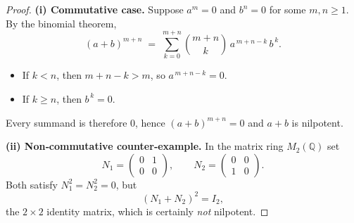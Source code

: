 \documentclass[12pt]{article}
\theoremstyle{definition} %
\theoremstyle{plain} %
\begin{document}
\begin{proof}
  \textbf{(i) Commutative case.}
  Suppose $a^{m}=0$ and $b^{n}=0$ for some $m,n\ge 1$.  By the binomial theorem,
  \[
    (a+b)^{m+n}\;=\;\sum_{k=0}^{m+n}\binom{m+n}{k}\,a^{\,m+n-k}\,b^{\,k}.
  \]
  \begin{itemize}
    \item If $k<n$, then $m+n-k>m$, so $a^{\,m+n-k}=0$.
    \item If $k\ge n$, then $b^{\,k}=0$.
  \end{itemize}
  Every summand is therefore $0$, hence $(a+b)^{m+n}=0$ and $a+b$ is nilpotent.

  \medskip
  \textbf{(ii) Non‑commutative counter‑example.}
  In the matrix ring $M_{2}(\mathbb{Q})$ set
  \[
    N_{1}=\begin{pmatrix}0&1\\ 0&0\end{pmatrix},\qquad
    N_{2}=\begin{pmatrix}0&0\\ 1&0\end{pmatrix}.
  \]
  Both satisfy $N_{1}^{2}=N_{2}^{2}=0$, but
  \[
    (N_{1}+N_{2})^{2}=I_{2},
  \]
  the $2\times 2$ identity matrix, which is certainly \emph{not} nilpotent.
\end{proof}
\end{document}
